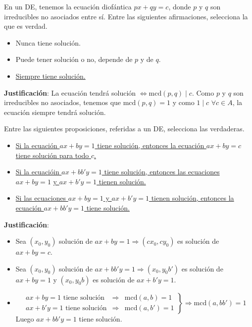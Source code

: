\begin{ejercicio}
    En un DE, tenemos la ecuación diofántica $px+qy=c$, donde $p$ y $q$ son irreducibles no asociados entre sí. Entre las siguientes afirmaciones, selecciona la que es verdad.
    \begin{itemize}
        \item Nunca tiene solución.
        \item Puede tener solución o no, depende de $p$ y de $q$. 
        \item \underline{Siempre tiene solución.}
    \end{itemize}

    \noindent
    \textbf{Justificación}:
    La ecuación tendrá solución $\Longleftrightarrow \text{mcd}(p,q)\mid c$. Como $p$ y $q$ son irreducibles no asociados, tenemos que $\text{mcd}(p,q)=1$ y como $1\mid c$ $\forall c \in A$, la ecuación siempre tendrá solución.
\end{ejercicio}

\begin{ejercicio}
    Entre las siguientes proposiciones, referidas a un DE, selecciona las verdaderas.
    \begin{itemize}
    \item \underline{Si la ecuación $ax+by=1$ tiene solución, entonces la ecuación $ax+by=c$} \newline
        \underline{ tiene solución para todo $c$.}
\item \underline{Si la ecuacióin $ax+bb'y=1$ tiene solución, entonces las ecuaciones $ax+by=1$}
    \underline{ y $ax+b'y=1$ tienen solución.} 
\item \underline{Si las ecuaciones $ax+by=1$ y $ax+b'y=1$ tienen solución, entonces la }\newline
    \underline{ecuación $ax+bb'y=1$ tiene solución.}
    \end{itemize}

    \noindent
    \textbf{Justificación}:
    \begin{itemize}
        \item Sea $(x_0,y_0)$ solución de $ax+by=1 \Longrightarrow (cx_0, cy_0)$ es solución de $ax+by=c$.
        \item Sea $(x_0,y_0)$ solución de $ax+bb'y=1 \Longrightarrow (x_0, y_0b')$ es solución de $ax+by=1$ y $(x_0, y_0b)$ es solución de $ax+b'y=1$.
        \item 
            \begin{equation*}
                \left.
                    \begin{array}{lcr}
                        ax+by=1 \text{\ tiene\ solución} & \Longrightarrow & \text{mcd}(a,b)=1 \\
                        ax+b'y=1 \text{\ tiene\ solución} & \Longrightarrow & \text{mcd}(a,b')=1
                    \end{array}
                \right\} \Longrightarrow \text{mcd}(a,bb')=1
            \end{equation*}
            Luego $ax+bb'y=1$ tiene solución. 
    \end{itemize}
\end{ejercicio}

\newpage
\resetearcontador
